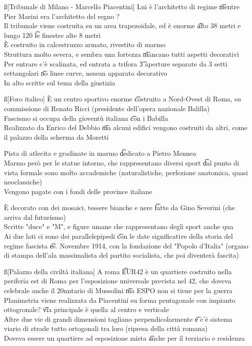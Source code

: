 \documentclass[12pt]{article}
\begin{document}
\ss[Tribunale di Milano - Marcello Piacentini]
Lui è l'architetto di regime \t mentre Pier Marini era l'architetto del regno ? \\
Il tribunale viene costruita su un area trapezoidale, ed è enorme \t alto 38 metri e lungo 120 \t le finestre alte 8 metri \\
È costruito in calcestruzzo armato, rivestito di marmo \\
Struttura molto severa, e sembra una fortezza \t mancano tutti aspetti decorativi \\
Per entrare c'è scalinata, ed entrata a trifora \t 3 aperture separate da 3 setti rettangolari \t no linee curve, nessun apparato decorativo \\
In alto scritte sul tema della giustizia

\ss[Foro italico]
È un centro sportivo enorme \t costruito a Nord-Ovest di Roma, su commissione di Renato Ricci (presidente dell'opera nazionale Balilla) \\
Fascismo si occupa della gioventù italiana \t con i Babilla \\
Realizzato da Enrico del Debbio \t ma alcuni edifici vengono costruiti da altri, come il palazzo della scherma da Moretti 

Pista di atlecita e gradinate in marmo \t dedicato a Pietro Mennea \\
Marmo però per le statue intorno, che rappresentano diversi sport \t dal punto di vista formale sono molto accademiche (naturalistiche, perfezione anatomica, quasi neoclassiche) \\
Vengono pagate con i fondi delle province italiane

È decorato con dei mosaici, tessere bianche e nere \t fatte da Gino Severini (che arriva dal futurismo) \\
Scritte "duce" e "M", e figure umane che rappresentano degli sport anche qua \\
Ai due lati ci sono dei parallelepipedi \t con le date significative della storia del regime fascista \t es. Novembre 1914, con la fondazione del "Popolo d'Italia" (organo di stampa dell'ala massimalista del partito socialista, che poi diventerà fascita)

\ss[Palazzo della civiltà italiana]
A roma \t EUR42 è un quartiere costruito nella periferia est di Roma per l'esposizione universale prevista nel 42, che doveva celebrale anche il 20nntario di Mussolini \t ma ESPO non si tiene per la guerra \\
Planimetria viene realizzata da Piacentini su forma pentagonale con impianto ottogronale? \t via principale è quella al centro e verticale \\
Altre due vie di grandi dimensioni tagliano perpendicolarmente \t e c'è sistema viario di strade tutto ortogonali tra loro (ripresa della città romana) \\
Doveva essere un quartiere ad esposizione mista \t anche per il terziario e residenza
\end{document}
